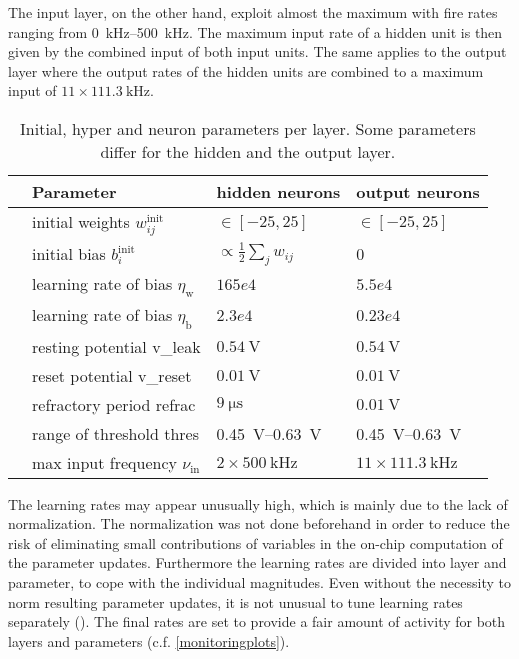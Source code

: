 The input layer, on the other hand, exploit almost the maximum with fire rates ranging from \SIrange{0}{500}{\kilo \Hz}. The maximum input rate of a hidden unit is then given by the combined input of both input units. The same applies to the output layer where the output rates of the hidden units are combined to a maximum input of $11 \times \SI{111.3}{\kilo \Hz}$.

\begin{table}\centering{}
	\begin{tabular}{@{}rlll@{}}\toprule
		& Parameter								& 	hidden neurons 			& 	output neurons 	\\ \midrule
		& initial weights $w_{ij}^\text{init}$	& 	 $\in[-25, 25]$			&	$\in[-25, 25]$	\\
		& initial bias $b_{i}^\text{init}$		& $\propto \frac{1}{2} \sum_j w_{ij}$ &	0		\\
		& learning rate of bias  $\eta_\text{w}$&	$165e4$					& 	$5.5e4$			\\
		& learning rate of bias  $\eta_\text{b}$&	$2.3e4$					& 	$0.23e4$		\\
		& resting potential \gls{v_leak}		&	$\SI{0.54}{\V}$ 		& 	$\SI{0.54}{\V}$	\\
		& reset potential \gls{v_reset}			&	$\SI{0.01}{\V}$			& 	$\SI{0.01}{\V}$	\\
		& refractory period \gls{refrac}		&	$\SI{9}{\micro \s}$			& 	$\SI{0.01}{\V}$	\\
		& range of threshold \gls{thres} 				&	\SIrange{0.45}{0.63}{\V}&	\SIrange{0.45}{0.63}{\V}\\
		& max input frequency $\nu_{\text{in}}$	&	$2 \times \SI{500}{\kilo \Hz}$	& $11 \times \SI{111.3}{\kilo\Hz}$	\\
		\bottomrule
	\end{tabular}
	\caption[Initial, hyper and neuron parameters per layer.]{Initial, hyper and neuron parameters per layer. Some parameters differ for the hidden and the output layer.}
	\label{circlesinitparameters}
\end{table}

The learning rates may appear unusually high, which is mainly due to the lack of normalization. The normalization was not done beforehand in order to reduce the risk of eliminating small contributions of variables in the on-chip computation of the parameter updates. Furthermore the learning rates are divided into layer and parameter, to cope with the individual magnitudes. Even without the necessity to norm resulting parameter updates, it is not unusual to tune learning rates separately (\citealp{Goodfellow-et-al-2016}). The final rates are set to provide a fair amount of activity for both layers and parameters (c.f. \cref{monitoringplots}).

